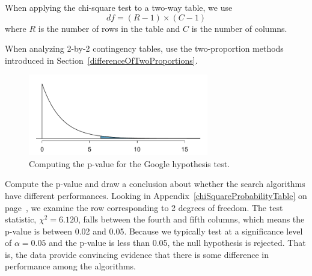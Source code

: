 \begin{termBox}{
When applying the chi-square test to a two-way table, we use
$$ df = (R-1)\times (C-1) $$
where $R$ is the number of rows in the table and $C$ is the number of columns.}
\end{termBox}

\begin{tipBox}{
When analyzing 2-by-2 contingency tables, use the two-proportion methods introduced in Section~\ref{differenceOfTwoProportions}.}
\end{tipBox}

\begin{figure}[h]
\centering
\includegraphics[width=0.7\textwidth]{ch_inference_for_props/figures/googleHTForDiffAlgPerformancePValue/googleHTForDiffAlgPerformancePValue}
\caption{Computing the p-value for the Google hypothesis test.}
\label{googleHTForDiffAlgPerformancePValue}
\end{figure}

\begin{example}{Compute the p-value and draw a conclusion about whether the search algorithms have different performances.}
Looking in Appendix~\ref{chiSquareProbabilityTable} on page~\pageref{chiSquareProbabilityTable}, we examine the row corresponding to 2 degrees of freedom. The test statistic, $\chi^2=6.120$, falls between the fourth and fifth columns, which means the p-value is between 0.02 and 0.05. Because we typically test at a significance level of $\alpha=0.05$ and the p-value is less than 0.05, the null hypothesis is rejected. That is, the data provide convincing evidence that there is some difference in performance among the algorithms.
\end{example}


